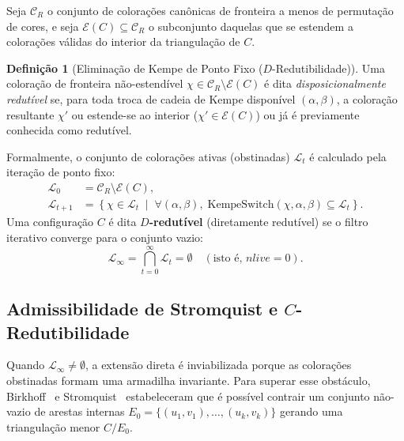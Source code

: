 \documentclass[11pt,a4paper]{article}
\theoremstyle{plain}
\theoremstyle{definition}
\newtheorem{definition}[theorem]{Definição}
\begin{document}
Seja $\mathcal{C}_R$ o conjunto de colorações canônicas de fronteira a menos de permutação de cores, e seja $\mathcal{E}(C) \subseteq \mathcal{C}_R$ o subconjunto daquelas que se estendem a colorações válidas do interior da triangulação de $C$.

\begin{definition}[Eliminação de Kempe de Ponto Fixo ($D$-Redutibilidade)]
Uma coloração de fronteira não-estendível $\chi \in \mathcal{C}_R \setminus \mathcal{E}(C)$ é dita \emph{disposicionalmente redutível} se, para toda troca de cadeia de Kempe disponível $(\alpha, \beta)$, a coloração resultante $\chi'$ ou estende-se ao interior ($\chi' \in \mathcal{E}(C)$) ou já é previamente conhecida como redutível.

Formalmente, o conjunto de colorações ativas (obstinadas) $\mathcal{L}_t$ é calculado pela iteração de ponto fixo:
\begin{align}
\mathcal{L}_0 &= \mathcal{C}_R \setminus \mathcal{E}(C), \\
\mathcal{L}_{t+1} &= \left\{ \chi \in \mathcal{L}_t \;\middle|\; \forall (\alpha, \beta), \; \text{KempeSwitch}(\chi, \alpha, \beta) \subseteq \mathcal{L}_t \right\}.
\end{align}
Uma configuração $C$ é dita \textbf{$D$-redutível} (diretamente redutível) se o filtro iterativo converge para o conjunto vazio:
\begin{equation}
\mathcal{L}_\infty = \bigcap_{t=0}^\infty \mathcal{L}_t = \emptyset \quad (\text{isto é, } nlive = 0).
\end{equation}
\end{definition}

\subsection{Admissibilidade de Stromquist e \texorpdfstring{$C$}{C}-Redutibilidade}

Quando $\mathcal{L}_\infty \neq \emptyset$, a extensão direta é inviabilizada porque as colorações obstinadas formam uma armadilha invariante. Para superar esse obstáculo, Birkhoff~\cite{birkhoff1913reducibility} e Stromquist~\cite{stromquist1975some} estabeleceram que é possível contrair um conjunto não-vazio de arestas internas $E_0 = \{(u_1, v_1), \dots, (u_k, v_k)\}$ gerando uma triangulação menor $C / E_0$.
\end{document}
